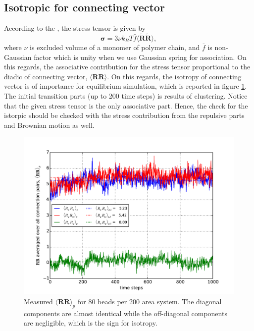 \documentclass[10pt, a4paper]{report}
\begin{document}
\subsection{Isotropic for connecting vector}
According to the \textcite{Ianniruberto:2015dv}, the stress tensor is given by
\begin{equation}
\boldsymbol{\sigma} = 3\nu k_BT\bar{f}\langle\mathbf{\tilde{R}\tilde{R}}\rangle,
\end{equation}
where $\nu$ is excluded volume of a monomer of polymer chain, and $\bar{f}$ is non-Gaussian factor which is unity when we use Gaussian spring for association. On this regards, the associative contribution for the stress tensor proportional to the diadic of connecting vector, $\langle\mathbf{RR} \rangle$. On this regards, the isotropy of connecting vector is of importance for equilibrium simulation, which is reported in figure \ref{fig:RR_isotropy}. The initial transition parts (up to 200 time steps) is results of clustering. Notice that the given stress tensor is the only associative part. Hence, the check for the istorpic should be checked with the stress contribution from the repulsive parts and Brownian motion as well.

\begin{figure}
  \centering
  \includegraphics[width=\textwidth]{figures/RR_NP80_C100_T3.pdf}
  \caption{Measured $\langle \mathbf{RR}\rangle_p$ for 80 beads per 200 area system. The diagonal components are almost identical while the off-diagonal components are negligible, which is the sign for isotropy.}
  \label{fig:RR_isotropy}
\end{figure}
\end{document}
